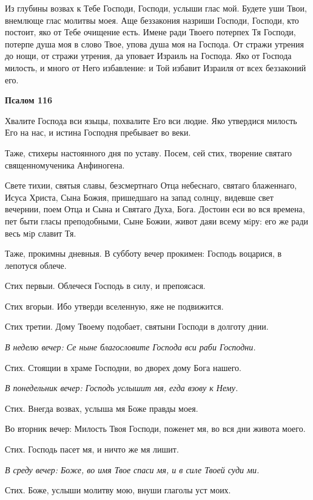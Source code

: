 Из глубины возвах к Тебе Господи, Господи, услыши глас мой. Будете уши Твои, внемлюще глас молитвы моея. Аще беззакония назриши Господи, Господи, кто постоит, яко от Тебе очищение есть. Имене ради Твоего потерпех Тя Господи, потерпе душа моя в слово Твое, упова душа моя на Господа. От стражи утрения до нощи, от стражи утрения, да уповает Израиль на Господа. Яко от Господа милость, и много от Него избавление: и Той избавит Израиля от всех беззаконий его.





\bfseries Псалом 116\normalfont{}


Хвалите Господа вси языцы, похвалите Его вси людие. Яко утвердися милость Его на нас, и истина Господня пребывает во веки.


Таже, стихеры настоянного дня по уставу. Посем, сей стих, творение святаго священномученика Анфиногена.


Свете тихии, святыя славы, безсмертнаго Отца небеснаго, святаго блаженнаго, Исуса Христа, Сына Божия, пришедшаго на запад солнцу, видевше свет вечернии, поем Отца и Сына и Святаго Духа, Бога. Достоин еси во вся времена, пет быти гласы преподобными, Сыне Божии, живот даяи всему мiру: его же ради весь мiр славит Тя.


Таже, прокимны дневныя. В субботу вечер прокимен: Господь воцарися, в лепотуся облече.


Стих первыи. Облечеся Господь в силу, и препоясася.


Стих вгорыи. Ибо утверди вселенную, яже не подвижится.


Стих третии. Дому Твоему подобает, святыни Господи в долготу днии.


\itshape В неделю вечер:\normalfont{} Се ныне благословите Господа вси раби Господни.


Стих. Стоящии в храме Господни, во дворех дому Бога нашего.


\itshape В понедельник вечер:\normalfont{} Господь услышит мя, егда взову к Нему.


Стих. Внегда возвах, услыша мя Боже правды моея.


Во вторник вечер: Милость Твоя Господи, поженет мя, во вся дни живота моего.


Стих. Господь пасет мя, и ничто же мя лишит.


\itshape В среду вечер:\normalfont{} Боже, во имя Твое спаси мя, и в силе Твоей суди ми.


Стих. Боже, услыши молитву мою, внуши глаголы уст моих.


